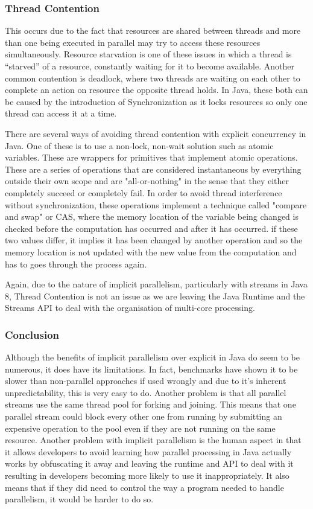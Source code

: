 \documentclass[]{report}
\begin{document}
\subsubsection{Thread Contention} 
This occurs due to the fact that resources are shared between threads and more than one being executed in parallel may try to access these resources simultaneously. Resource starvation is one of these issues in which a thread is “starved” of a resource, constantly waiting for it to become available\cite{Starvation}. Another common contention is deadlock, where two threads are waiting on each other to complete an action on resource the opposite thread holds. In Java, these both can be caused by the introduction of Synchronization as it locks resources so only one thread can access it at a time.\cite{Synchronization}

There are several ways of avoiding thread contention with explicit concurrency in Java. One of these is to use a non-lock, non-wait solution such as atomic variables. These are wrappers for primitives that implement atomic operations. These are a series of operations that are considered instantaneous by everything outside their own scope and are "all-or-nothing" in the sense that they either completely succeed or completely fail.\cite{Atomic Variables} In order to avoid thread interference without synchronization, these operations implement a technique called "compare and swap" or CAS, where the memory location of the variable being changed is checked before the computation has occurred and after it has occurred. if these two values differ, it implies it has been changed by another operation and so the memory location is not updated with the new value from the computation and has to goes through the process again.\cite{Compare Swap}

Again, due to the nature of implicit parallelism, particularly with streams in Java 8, Thread Contention is not an issue as we are leaving the Java Runtime and the Streams API to deal with the organisation of multi-core processing.

\subsubsection{Conclusion}
Although the benefits of implicit parallelism over explicit in Java do seem to be numerous, it does have its limitations. In fact, benchmarks have shown it to be slower than non-parallel approaches if used wrongly and due to it's inherent unpredictability, this is very easy to do.\cite{Stream API} Another problem is that all parallel streams use the same thread pool for forking and joining\cite{Common Thread Pool}. This means that one parallel stream could block every other one from running by submitting an expensive operation to the pool even if they are not running on the same resource. Another problem with implicit parallelism is the human aspect in that it allows developers to avoid learning how parallel processing in Java actually works by obfuscating it away and leaving the runtime and API to deal with it resulting in developers becoming more likely to use it inappropriately. It also means that if they did need to control the way a program needed to handle parallelism, it would be harder to do so. 
\end{document}
